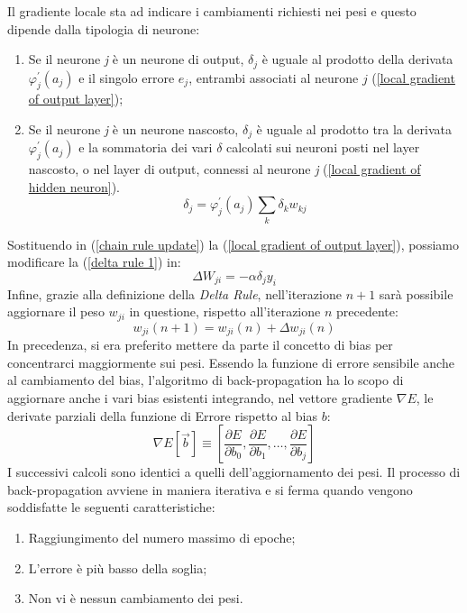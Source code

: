 Il gradiente locale sta ad indicare i cambiamenti richiesti nei pesi e questo dipende 
dalla tipologia di neurone:
\begin{enumerate}
    \item Se il neurone \emph{j} è un neurone di output, $\delta_j$ è uguale al prodotto della derivata 
    $\varphi_j^{'}(a_j)$ e il singolo errore $e_{j}$, entrambi associati al neurone $j$ (\ref{local gradient of output layer});
    \item Se il neurone \emph{j} è un neurone nascosto, $\delta_j$ è uguale al prodotto tra la derivata 
    $\varphi_j^{'}(a_j)$ e la sommatoria dei vari $\delta$ calcolati sui neuroni posti nel layer nascosto, 
    o nel layer di output, connessi al neurone \emph{j} (\ref{local gradient of hidden neuron}).
    \begin{equation}\label{local gradient of hidden neuron}
        \delta_j = \varphi_j^{'}(a_j)\sum_{k}\delta_kw_{kj}
    \end{equation}
\end{enumerate}
Sostituendo in (\ref{chain rule update}) la (\ref{local gradient of output layer}), possiamo modificare la (\ref{delta rule 1}) in:
\begin{equation}\label{delta rule 2}
    \Delta{W_{ji}} = -\alpha \delta_jy_i 
\end{equation}
Infine, grazie alla definizione della \emph{Delta Rule}, nell’iterazione $n+1$ sarà possibile 
aggiornare il peso $w_{ji}$ in questione, rispetto all’iterazione $n$ precedente:
\begin{equation}\label{weight change}
    w_{ji}(n+1) = w_{ji}(n)+\Delta{w_{ji}(n)}
\end{equation}
In precedenza, si era preferito mettere da parte il concetto di bias per concentrarci 
maggiormente sui pesi. Essendo la funzione di errore sensibile anche al cambiamento 
del bias, l’algoritmo di back-propagation ha lo scopo di aggiornare anche i 
vari bias esistenti integrando, nel vettore gradiente $\nabla{E}$, le derivate parziali della 
funzione di Errore rispetto al bias $b$:
\begin{equation}\label{gradient vector with bias}
    \nabla{E}[\vec{b}]\equiv\left[\frac{\partial E}{\partial b_{0}}, \frac{\partial E}{\partial b_{1}}, \dots, \frac{\partial E}{\partial b_{j}}\right]
\end{equation}
I successivi calcoli sono identici a quelli dell’aggiornamento dei pesi. Il processo 
di back-propagation avviene in maniera iterativa e si ferma quando vengono 
soddisfatte le seguenti caratteristiche:
\begin{enumerate}
    \item Raggiungimento del numero massimo di epoche;
    \item L’errore è più basso della soglia;
    \item Non vi è nessun cambiamento dei pesi.
\end{enumerate}

